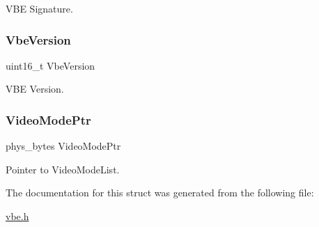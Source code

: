 V\+BE Signature. 

\hypertarget{structvbe__info__block__t_a7b9fef89774326b46f9481cbd9a397d3}{}\label{structvbe__info__block__t_a7b9fef89774326b46f9481cbd9a397d3} 
\subsubsection{\texorpdfstring{Vbe\+Version}{VbeVersion}}
{\footnotesize\ttfamily uint16\+\_\+t Vbe\+Version}



V\+BE Version. 

\hypertarget{structvbe__info__block__t_a9d989fdbcdad6a40c10fc28c0f9af760}{}\label{structvbe__info__block__t_a9d989fdbcdad6a40c10fc28c0f9af760} 
\subsubsection{\texorpdfstring{Video\+Mode\+Ptr}{VideoModePtr}}
{\footnotesize\ttfamily phys\+\_\+bytes Video\+Mode\+Ptr}



Pointer to Video\+Mode\+List. 



The documentation for this struct was generated from the following file\+:\begin{DoxyCompactItemize}
\item 
\hyperlink{vbe_8h}{vbe.\+h}\end{DoxyCompactItemize}
